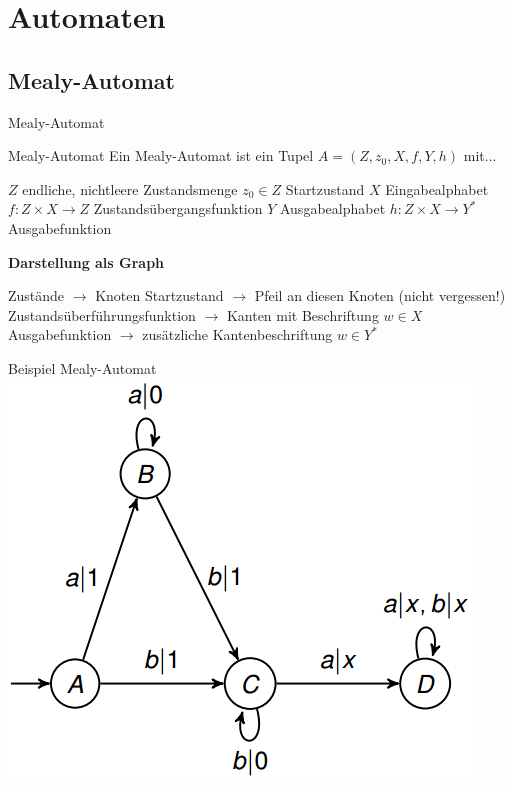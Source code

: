 \documentclass[handout]{beamer}
\begin{document}

\begin{frame}
	\titlepage
\end{frame}

\section{Automaten}
\subsection{Mealy-Automat}
\begin{frame}{Mealy-Automat}
	\begin{block}{Mealy-Automat}
		Ein Mealy-Automat ist ein Tupel $A = (Z, z_0, X, f, Y, h)$ mit...
		\begin{itemize}
			\pitem $Z$ endliche, nichtleere Zustandsmenge 
			\pitem $z_0 \in Z$ Startzustand 
			\pitem $X$ Eingabealphabet 
			\pitem $f: Z \times X \rightarrow Z$ Zustandsübergangsfunktion 
			\pitem $Y$ Ausgabealphabet 
			\pitem $h: Z \times X \rightarrow Y^*$ Ausgabefunktion 
		\end{itemize}
	\end{block}

	\pause 
	
	
	\textbf{Darstellung als Graph}\\
	\begin{itemize}
		\pitem Zustände $\rightarrow$ Knoten
		\pitem Startzustand $\rightarrow$ Pfeil an diesen Knoten (nicht vergessen!)
		\pitem Zustandsüberführungsfunktion $\rightarrow$ Kanten mit Beschriftung \(w \in X\)
		\pitem Ausgabefunktion $\rightarrow$ zusätzliche Kantenbeschriftung \(w \in Y^*\)
	\end{itemize}
\end{frame}

\begin{frame}{Beispiel Mealy-Automat}
	\includegraphics[scale=0.6]{images/MealyBsp.png}
\end{frame}
\end{document}

